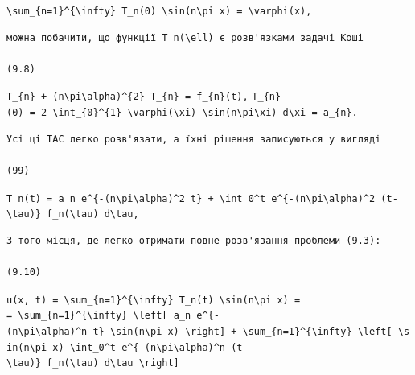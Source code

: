 \documentclass[
  ukrainian,
]{article}
\begin{document}
\texttt{\textbackslash{}sum\_\{n=1\}\^{}\{\textbackslash{}infty\}\ T\_n(0)\ \textbackslash{}sin(n\textbackslash{}pi\ x)\ =\ \textbackslash{}varphi(x),}

\begin{verbatim}
можна побачити, що функції T_n(\ell) є розв'язками задачі Коші

(9.8)
\end{verbatim}

\texttt{T\_\{n\}\ +\ (n\textbackslash{}pi\textbackslash{}alpha)\^{}\{2\}\ T\_\{n\}\ =\ f\_\{n\}(t),}
\texttt{T\_\{n\}(0)\ =\ 2\ \textbackslash{}int\_\{0\}\^{}\{1\}\ \textbackslash{}varphi(\textbackslash{}xi)\ \textbackslash{}sin(n\textbackslash{}pi\textbackslash{}xi)\ d\textbackslash{}xi\ =\ a\_\{n\}.}

\begin{verbatim}
Усі ці TAC легко розв'язати, а їхні рішення записуються у вигляді

(99)
\end{verbatim}

\texttt{T\_n(t)\ =\ a\_n\ e\^{}\{-(n\textbackslash{}pi\textbackslash{}alpha)\^{}2\ t\}\ +\ \textbackslash{}int\_0\^{}t\ e\^{}\{-(n\textbackslash{}pi\textbackslash{}alpha)\^{}2\ (t-\textbackslash{}tau)\}\ f\_n(\textbackslash{}tau)\ d\textbackslash{}tau,}

\begin{verbatim}
З того місця, де легко отримати повне розв'язання проблеми (9.3):

(9.10)
\end{verbatim}

\texttt{u(x,\ t)\ =\ \textbackslash{}sum\_\{n=1\}\^{}\{\textbackslash{}infty\}\ T\_n(t)\ \textbackslash{}sin(n\textbackslash{}pi\ x)\ =}
\texttt{=\ \textbackslash{}sum\_\{n=1\}\^{}\{\textbackslash{}infty\}\ \textbackslash{}left{[}\ a\_n\ e\^{}\{-(n\textbackslash{}pi\textbackslash{}alpha)\^{}n\ t\}\ \textbackslash{}sin(n\textbackslash{}pi\ x)\ \textbackslash{}right{]}\ +\ \textbackslash{}sum\_\{n=1\}\^{}\{\textbackslash{}infty\}\ \textbackslash{}left{[}\ \textbackslash{}sin(n\textbackslash{}pi\ x)\ \textbackslash{}int\_0\^{}t\ e\^{}\{-(n\textbackslash{}pi\textbackslash{}alpha)\^{}n\ (t-\textbackslash{}tau)\}\ f\_n(\textbackslash{}tau)\ d\textbackslash{}tau\ \textbackslash{}right{]}}
\end{document}
